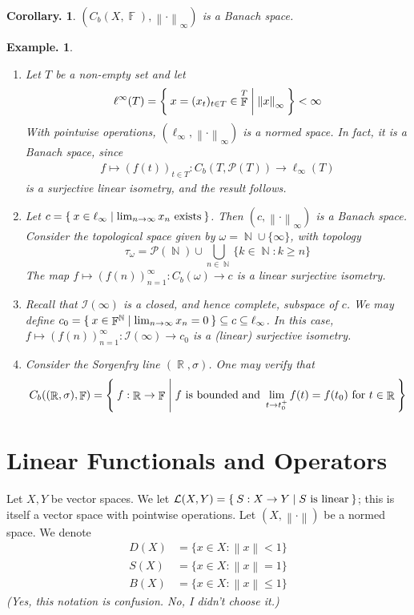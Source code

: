 \documentclass[11pt, a4paper]{memoir}
\DeclareMathOperator{\N}{{\mathbb{N}}}
\DeclareMathOperator{\R}{{\mathbb{R}}}
\DeclareMathOperator{\F}{{\mathbb{F}}}
\newcommand{\norm}[1]{\ensuremath{\left\lVert#1\right\rVert}}
\theoremstyle{change}
\newtheorem{corollary}[theorem]{Corollary.}
\theoremstyle{plain}
\theoremstyle{nonumberplain}
\newtheorem{example}{Example.}
\newcommand{\lp}[1]{\ensuremath{\ell^{#1}}}
\numberwithin{equation}{section}
\begin{document}
\begin{corollary}
    $(C_b(X,\F),\norm{\cdot}_\infty)$ is a Banach space.
\end{corollary}
\begin{example}
    \begin{enumerate}[nl,r]
        \item Let $T$ be a non-empty set and let
            \begin{equation*}
                \lp{\infty}(T) = \Set{x=(x_t)_{t\in T}\in\F^T | \norm{x}_\infty}<\infty
            \end{equation*}
            With pointwise operations, $(\ell_\infty,\norm{\cdot}_\infty)$ is a normed space.
            In fact, it is a Banach space, since
            \begin{align*}
                f\mapsto (f(t))_{t\in T}:C_b(T,\mathcal{P}(T))\to\ell_\infty(T)
            \end{align*}
            is a surjective linear isometry, and the result follows.
        \item Let $c=\Set{x\in\ell_\infty | \lim_{n\to\infty}x_n\text{ exists}}$.
            Then $(c,\norm{\cdot}_\infty)$ is a Banach space.
            Consider the topological space given by $\omega=\N\cup\{\infty\}$, with topology
            \begin{equation*}
                \tau_\omega=\mathcal{P}(\N)\cup\bigcup_{n\in\N}\{k\in\N:k\geq n\}
            \end{equation*}
            The map $f\mapsto(f(n))_{n=1}^\infty:C_b(\omega)\to c$ is a linear surjective isometry.
        \item Recall that $\mathcal{I}(\infty)$ is a closed, and hence complete, subspace of $c$.
            We may define $c_0=\Set{x\in\F^{\N} | \lim_{n\to\infty}x_n=0}\subseteq c\subseteq\ell_\infty$.
            In this case, $f\mapsto(f(n))_{n=1}^\infty:\mathcal{I}(\infty)\to c_0$ is a (linear) surjective isometry.
        \item Consider the Sorgenfry line $(\R,\sigma)$.
            One may verify that
            \begin{equation*}
                C_b((\R,\sigma),\F)=\Set{f:\R\to\F | f\text{ is bounded and }\lim_{t\to t_0^+} f(t)=f(t_0)\text{ for }t\in\R}
            \end{equation*}
    \end{enumerate}
\end{example}
\section{Linear Functionals and Operators}
Let $X,Y$ be vector spaces.
We let $\mathcal{L}(X,Y)=\Set{S:X\to Y | S\text{ is linear}}$; this is itself a vector space with pointwise operations.
Let $(X,\norm{\cdot})$ be a normed space.
We denote
\begin{align*}
    D(X) &= \{x\in X:\norm{x}<1\}\\
    S(X) &= \{x\in X:\norm{x}=1\}\\
    B(X) &= \{x\in X:\norm{x}\leq 1\}
\end{align*}
\textit{(Yes, this notation is confusion. No, I didn't choose it.)}
\end{document}
